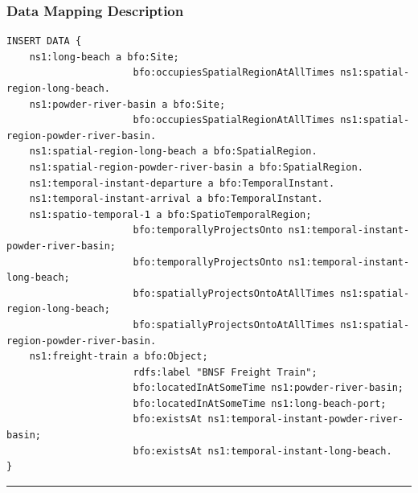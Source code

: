 \subsubsection*{Data Mapping Description}

\begin{verbatim}
INSERT DATA {
    ns1:long-beach a bfo:Site; 
                      bfo:occupiesSpatialRegionAtAllTimes ns1:spatial-region-long-beach.
    ns1:powder-river-basin a bfo:Site; 
                      bfo:occupiesSpatialRegionAtAllTimes ns1:spatial-region-powder-river-basin.
    ns1:spatial-region-long-beach a bfo:SpatialRegion.
    ns1:spatial-region-powder-river-basin a bfo:SpatialRegion.
    ns1:temporal-instant-departure a bfo:TemporalInstant.
    ns1:temporal-instant-arrival a bfo:TemporalInstant.
    ns1:spatio-temporal-1 a bfo:SpatioTemporalRegion;
                      bfo:temporallyProjectsOnto ns1:temporal-instant-powder-river-basin;
                      bfo:temporallyProjectsOnto ns1:temporal-instant-long-beach;
                      bfo:spatiallyProjectsOntoAtAllTimes ns1:spatial-region-long-beach;
                      bfo:spatiallyProjectsOntoAtAllTimes ns1:spatial-region-powder-river-basin. 
    ns1:freight-train a bfo:Object;
                      rdfs:label "BNSF Freight Train";   
                      bfo:locatedInAtSomeTime ns1:powder-river-basin;
                      bfo:locatedInAtSomeTime ns1:long-beach-port;
                      bfo:existsAt ns1:temporal-instant-powder-river-basin;
                      bfo:existsAt ns1:temporal-instant-long-beach.               
}
\end{verbatim}
\noindent\rule{\linewidth}{0.1pt}
